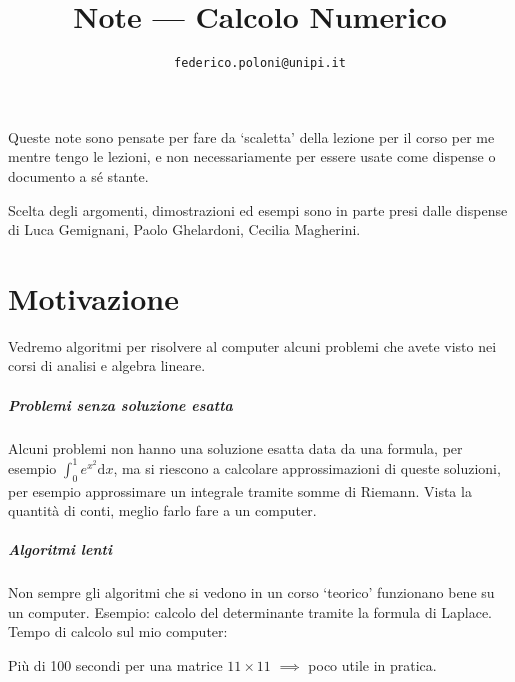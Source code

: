 \documentclass[a4paper]{report}
\title{Note --- Calcolo Numerico}
\author{\texttt{federico.poloni@unipi.it}}
\date{}
\theoremstyle{definiton}
\theoremstyle{remark}
\begin{document}
\maketitle

Queste note sono pensate per fare da `scaletta' della lezione per il corso per me mentre tengo le lezioni, e non necessariamente per essere usate come dispense o documento a sé stante.

Scelta degli argomenti, dimostrazioni ed esempi sono in parte presi dalle dispense di Luca Gemignani, Paolo Ghelardoni, Cecilia Magherini.


\chapter{Motivazione}

Vedremo algoritmi per risolvere al computer alcuni problemi che avete visto nei corsi di analisi e algebra lineare. 

\paragraph{Problemi senza soluzione esatta} Alcuni problemi non hanno una soluzione esatta data da una formula, per esempio $\int_0^1 e^{x^2} \mathrm{d}x$, ma si riescono a calcolare approssimazioni di queste soluzioni, per esempio approssimare un integrale tramite somme di Riemann. Vista la quantità di conti, meglio farlo fare a un computer.

\paragraph{Algoritmi lenti} Non sempre gli algoritmi che si vedono in un corso `teorico' funzionano bene su un computer. Esempio: calcolo del determinante tramite la formula di Laplace. Tempo di calcolo sul mio computer:
\begin{center}
\end{center}
Più di 100 secondi per una matrice $11\times 11$ $\implies$ poco utile in pratica.
\end{document}
